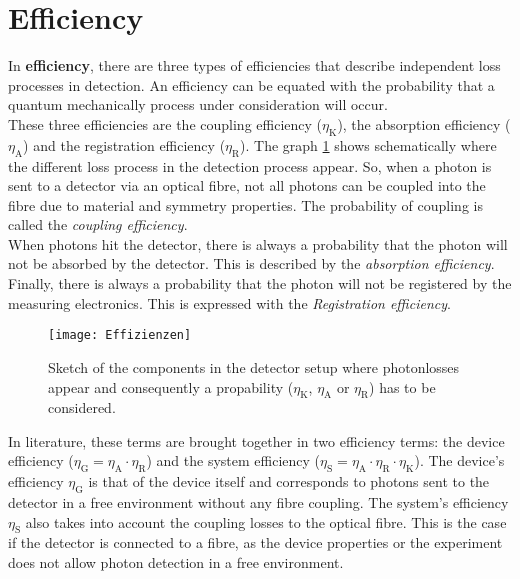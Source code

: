 \section{Efficiency}
In \textbf{efficiency}, there are three types of efficiencies that describe independent loss processes in detection.
An efficiency can be equated with the probability that a quantum mechanically process under consideration will occur.\\
These three efficiencies are the coupling efficiency ($\eta_{\text{K}}$),
the absorption efficiency ($\eta_{\text{A}}$) and the registration efficiency ($\eta_{\text{R}}$).
The graph \ref{fig: single_efficiency_terms} shows schematically where the different loss process in the detection
process appear. So, when a photon is sent to a detector via an optical fibre, not all photons can be coupled into the
fibre due to material and symmetry properties.
The probability of coupling is called the \textit{coupling efficiency}. \\
When photons hit the detector, there is always a probability that the photon will not be absorbed by the detector.
This is described by the \textit{absorption efficiency}. \\
Finally, there is always a probability that the photon will not be registered by the measuring electronics.
This is expressed with the \textit{Registration efficiency}. \\

\begin{figure}[hhh]
    \centering
    \texttt{[image: Effizienzen]}
    \caption{Sketch of the components in the detector setup where photonlosses appear and consequently a propability
     ($\eta_{\text{K}}$, $\eta_{\text{A}}$ or $\eta_{\text{R}}$) has to be considered.}
    \label{fig: single_efficiency_terms}
\end{figure}

In literature, these terms are brought together in two efficiency terms: the device efficiency
($\eta_{\text{G}} = \eta_{\text{A}} \cdot \eta_{\text{R}}$) and the system efficiency
($\eta_{\text{S}} = \eta_{\text{A}} \cdot \eta_{\text{R}} \cdot \eta_{\text{K}}$).
The device's efficiency $\eta_{\text{G}}$ is that of the device itself and corresponds to photons sent
to the detector in a free environment without any fibre coupling.
The system's efficiency $\eta_{\text{S}}$ also takes into account the coupling losses to the optical fibre.
This is the case if the detector is connected to a fibre, as the device properties or the experiment does not allow
photon detection in a free environment.\\

